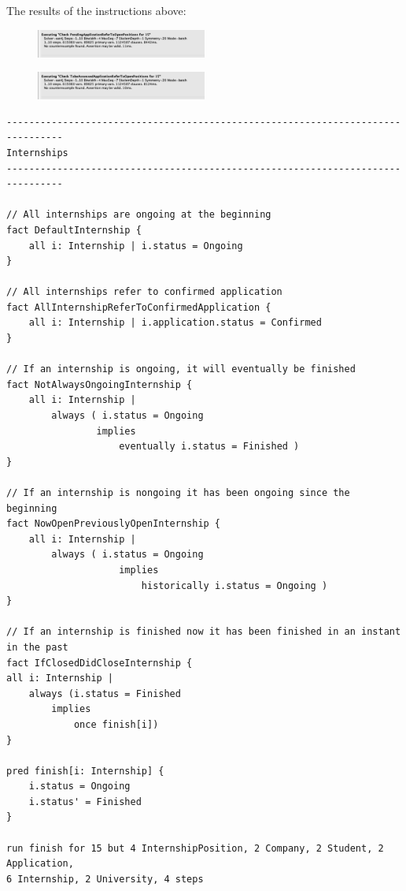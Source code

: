 The results of the instructions above:
\begin{figure}[h!]
    \centering\includegraphics[width=0.5\textwidth]{RASD/Images/Alloy/checkPendingApplicationsReferToOpenPositions.png}
    \label{fig:checkPendingApplicationsReferToOpenPositions}
\end{figure}
\begin{figure}[h!]
    \centering\includegraphics[width=0.5\textwidth]{RASD/Images/Alloy/checkTobeAssessedApplicationReferToOpenPositions.png}
    \label{fig:TobeAssessedApplicationReferToOpenPositions}
\end{figure}
\newpage
\begin{verbatim}
--------------------------------------------------------------------------------
Internships
--------------------------------------------------------------------------------

// All internships are ongoing at the beginning
fact DefaultInternship {
    all i: Internship | i.status = Ongoing
}

// All internships refer to confirmed application 
fact AllInternshipReferToConfirmedApplication {
    all i: Internship | i.application.status = Confirmed
}

// If an internship is ongoing, it will eventually be finished
fact NotAlwaysOngoingInternship {
    all i: Internship | 
        always ( i.status = Ongoing
                implies 
                    eventually i.status = Finished )
}

// If an internship is nongoing it has been ongoing since the beginning
fact NowOpenPreviouslyOpenInternship {
    all i: Internship | 
        always ( i.status = Ongoing
                    implies 
                        historically i.status = Ongoing )
}

// If an internship is finished now it has been finished in an instant in the past
fact IfClosedDidCloseInternship {
all i: Internship |
    always (i.status = Finished
        implies 
            once finish[i])
}

pred finish[i: Internship] {
    i.status = Ongoing
    i.status' = Finished
}

run finish for 15 but 4 InternshipPosition, 2 Company, 2 Student, 2 Application, 
6 Internship, 2 University, 4 steps
\end{verbatim}

